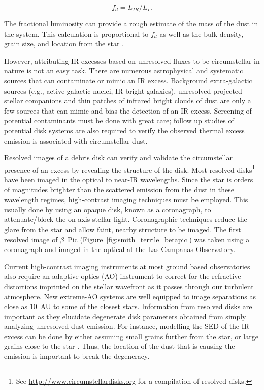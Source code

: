         \begin{equation}\label{eq:fd}
        f_d = L_{IR}/L_{\star}.
        \end{equation}
        
        \noindent The fractional luminosity can provide a rough estimate of the mass of the dust in the system. This calculation is proportional to $f_d$ as well as the bulk density, grain size, and location from the star \citep{Beckwith2000}. 
        
        However, attributing IR excesses based on unresolved fluxes to be circumstellar in nature is not an easy task. There are numerous astrophysical and systematic sources that can contaminate or mimic an IR excess. Background extra-galactic sources (e.g., active galactic nuclei, IR bright galaxies), unresolved projected stellar companions and thin patches of infrared bright clouds of dust are only a few sources that can mimic and bias the detection of an IR excess. Screening of potential contaminants must be done with great care; follow up studies of potential disk systems are also required to verify the observed thermal excess emission is associated with circumstellar dust.
        
    Resolved images of a debris disk can verify and validate the circumstellar presence of an excess by revealing the structure of the disk. Most resolved disks\footnote{See \url{http://www.circumstellardisks.org} for a compilation of resolved disks.} have been imaged in the optical to near-IR wavelengths. Since the star is orders of magnitudes brighter than the scattered emission from the dust in these wavelength regimes, high-contrast imaging techniques must be employed. This usually done by using an opaque disk, known as a coronagraph, to attenuate/block the on-axis stellar light. Coronagraphic techniques reduce the glare from the star and allow faint, nearby structure to be imaged. The first resolved image of $\beta$~Pic (Figure~\ref{fig:smith_terrile_betapic}) was taken using a coronagraph and imaged in the optical at the Las Campanas Observatory.
        
    Current high-contrast imaging instruments at most ground based observatories also require an adaptive optics (AO) instrument to correct for the refractive distortions imprinted on the stellar wavefront as it passes through our turbulent atmosphere. New extreme-AO systems \citep[e.g., Gemini Planet Imager,][]{Macintosh2006} are well equipped to image separations as close as 10~AU to some of the closest stars. Information from resolved disks are important as they elucidate degenerate disk parameters obtained from simply analyzing unresolved dust emission. For instance, modelling the SED of the IR excess can be done by either assuming small grains further from the star, or large grains close to the star \citep{Krivov2010}. Thus, the location of the dust that is causing the emission is important to break the degeneracy\citep[e.g., Figure 13][]{Su2006}. 
        
